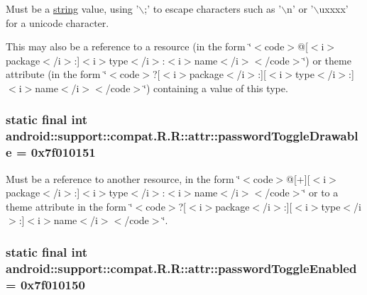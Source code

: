 Must be a \hyperlink{classandroid_1_1support_1_1compat_1_1_r_1_1string}{string} value, using '$\backslash$;' to escape characters such as '$\backslash$n' or '$\backslash$uxxxx' for a unicode character. 

This may also be a reference to a resource (in the form \char`\"{}$<$code$>$@\mbox{[}$<$i$>$package$<$/i$>$:\mbox{]}$<$i$>$type$<$/i$>$:$<$i$>$name$<$/i$>$$<$/code$>$\char`\"{}) or theme attribute (in the form \char`\"{}$<$code$>$?\mbox{[}$<$i$>$package$<$/i$>$:\mbox{]}\mbox{[}$<$i$>$type$<$/i$>$:\mbox{]}$<$i$>$name$<$/i$>$$<$/code$>$\char`\"{}) containing a value of this type. \hypertarget{classandroid_1_1support_1_1compat_1_1_r_1_1attr_d784e9da2969b49c64df0b8a3a6b2daf}{
\subsubsection[{passwordToggleDrawable}]{\setlength{\rightskip}{0pt plus 5cm}static final int android::support::compat.R.R::attr::passwordToggleDrawable = 0x7f010151}}
\label{classandroid_1_1support_1_1compat_1_1_r_1_1attr_d784e9da2969b49c64df0b8a3a6b2daf}


Must be a reference to another resource, in the form \char`\"{}$<$code$>$@\mbox{[}+\mbox{]}\mbox{[}$<$i$>$package$<$/i$>$:\mbox{]}$<$i$>$type$<$/i$>$:$<$i$>$name$<$/i$>$$<$/code$>$\char`\"{} or to a theme attribute in the form \char`\"{}$<$code$>$?\mbox{[}$<$i$>$package$<$/i$>$:\mbox{]}\mbox{[}$<$i$>$type$<$/i$>$:\mbox{]}$<$i$>$name$<$/i$>$$<$/code$>$\char`\"{}. \hypertarget{classandroid_1_1support_1_1compat_1_1_r_1_1attr_dfe9296ddf9d0c59c9ade08645aa6225}{
\subsubsection[{passwordToggleEnabled}]{\setlength{\rightskip}{0pt plus 5cm}static final int android::support::compat.R.R::attr::passwordToggleEnabled = 0x7f010150}}
\label{classandroid_1_1support_1_1compat_1_1_r_1_1attr_dfe9296ddf9d0c59c9ade08645aa6225}


